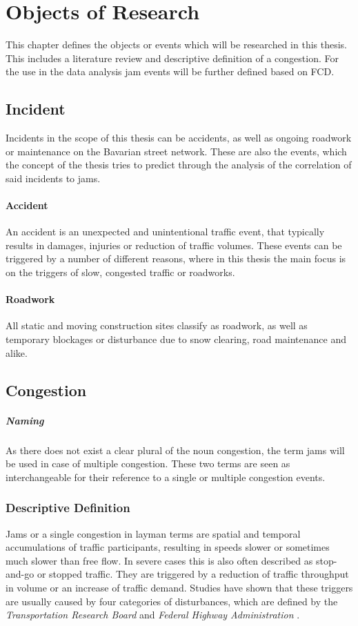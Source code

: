 \chapter{Objects of Research}
This chapter defines the objects or events which will be researched in this thesis. This includes a literature review and descriptive definition of a congestion. For the use in the data analysis jam events will be further defined based on FCD.  

\section{Incident}
Incidents in the scope of this thesis can be accidents, as well as ongoing roadwork or maintenance on the Bavarian street network. These are also the events, which the concept of the thesis tries to predict through the analysis of the correlation of said incidents to jams.
\subsubsection{Accident}
An accident is an unexpected and unintentional traffic event, that typically results in damages, injuries or reduction of traffic volumes. These events can be triggered by a number of different reasons, where in this thesis the main focus is on the triggers of slow, congested traffic or roadworks.
\subsubsection{Roadwork}
All static and moving construction sites classify as roadwork, as well as temporary blockages or disturbance due to snow clearing, road maintenance and alike. 
	
\section{Congestion}
\label{definition_congestion}

\paragraph{Naming} As there does not exist a clear plural of the noun congestion, the term jams will be used in case of multiple congestion. These two terms are seen as interchangeable for their reference to a single or multiple congestion events.

\subsection{Descriptive Definition}
Jams or a single congestion in layman terms are spatial and temporal accumulations of traffic participants, resulting in speeds slower or sometimes much slower than free flow. In severe cases this is also often described as stop-and-go or stopped traffic. They are triggered by a reduction of traffic throughput in volume or an increase of traffic demand. Studies have shown that these triggers are usually caused by four categories of disturbances, which are defined by the \textit{Transportation Research Board} \parencite{TRB2003} and \textit{Federal Highway Administration} \parencite{FHA2011}.

